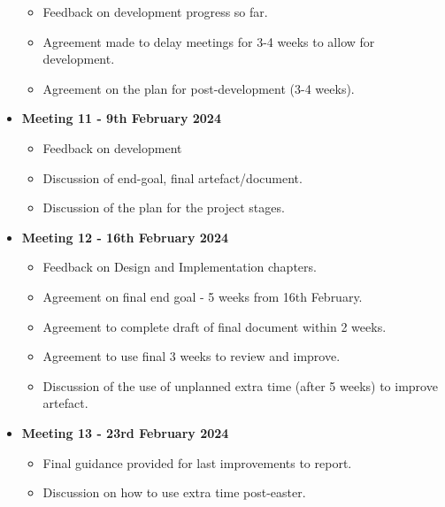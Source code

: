 \begin{itemize}
\begin{itemize}
        \item Feedback on development progress so far.
        \item Agreement made to delay meetings for 3-4 weeks to allow for development.
        \item Agreement on the plan for post-development (3-4 weeks).
    \end{itemize}
    \item \textbf{Meeting 11 - 9th February 2024}
    \begin{itemize}
        \item Feedback on development
        \item Discussion of end-goal, final artefact/document.
        \item Discussion of the plan for the project stages.
    \end{itemize}
    \item \textbf{Meeting 12 - 16th February 2024}
    \begin{itemize}
        \item Feedback on Design and Implementation chapters.
        \item Agreement on final end goal - 5 weeks from 16th February.
        \item Agreement to complete draft of final document within 2 weeks.
        \item Agreement to use final 3 weeks to review and improve.
        \item Discussion of the use of unplanned extra time (after 5 weeks) to improve artefact.
    \end{itemize}
    \item \textbf{Meeting 13 - 23rd February 2024}
    \begin{itemize}
        \item Final guidance provided for last improvements to report.
        \item Discussion on how to use extra time post-easter.
    \end{itemize}
\end{itemize}